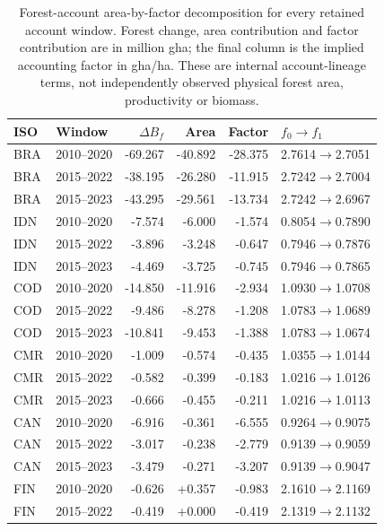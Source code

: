 \documentclass[11pt,a4paper]{article}
\begin{document}
\begin{table}[htbp]
\centering\small
\caption{Forest-account area-by-factor decomposition for every retained account window. Forest change, area contribution and factor contribution are in million gha; the final column is the implied accounting factor in gha/ha. These are internal account-lineage terms, not independently observed physical forest area, productivity or biomass.}\label{tab:SI_forest_decomposition}
\begin{tabularx}{\textwidth}{llrrrX}\toprule
ISO & Window & $\Delta B_f$ & Area & Factor & $f_0\rightarrow f_1$\\\midrule
BRA & 2010--2020 & -69.267 & -40.892 & -28.375 & 2.7614$\rightarrow$2.7051\\
BRA & 2015--2022 & -38.195 & -26.280 & -11.915 & 2.7242$\rightarrow$2.7004\\
BRA & 2015--2023 & -43.295 & -29.561 & -13.734 & 2.7242$\rightarrow$2.6967\\
IDN & 2010--2020 & -7.574 & -6.000 & -1.574 & 0.8054$\rightarrow$0.7890\\
IDN & 2015--2022 & -3.896 & -3.248 & -0.647 & 0.7946$\rightarrow$0.7876\\
IDN & 2015--2023 & -4.469 & -3.725 & -0.745 & 0.7946$\rightarrow$0.7865\\
COD & 2010--2020 & -14.850 & -11.916 & -2.934 & 1.0930$\rightarrow$1.0708\\
COD & 2015--2022 & -9.486 & -8.278 & -1.208 & 1.0783$\rightarrow$1.0689\\
COD & 2015--2023 & -10.841 & -9.453 & -1.388 & 1.0783$\rightarrow$1.0674\\
CMR & 2010--2020 & -1.009 & -0.574 & -0.435 & 1.0355$\rightarrow$1.0144\\
CMR & 2015--2022 & -0.582 & -0.399 & -0.183 & 1.0216$\rightarrow$1.0126\\
CMR & 2015--2023 & -0.666 & -0.455 & -0.211 & 1.0216$\rightarrow$1.0113\\
CAN & 2010--2020 & -6.916 & -0.361 & -6.555 & 0.9264$\rightarrow$0.9075\\
CAN & 2015--2022 & -3.017 & -0.238 & -2.779 & 0.9139$\rightarrow$0.9059\\
CAN & 2015--2023 & -3.479 & -0.271 & -3.207 & 0.9139$\rightarrow$0.9047\\
FIN & 2010--2020 & -0.626 & +0.357 & -0.983 & 2.1610$\rightarrow$2.1169\\
FIN & 2015--2022 & -0.419 & +0.000 & -0.419 & 2.1319$\rightarrow$2.1132\\

\end{tabularx}
\end{table}
\end{document}
